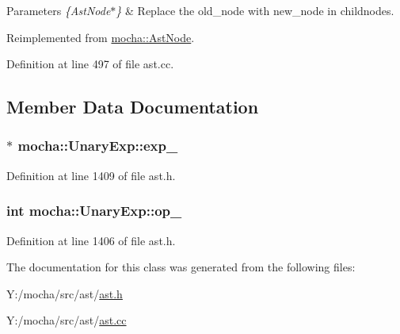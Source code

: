 \begin{DoxyParams}{Parameters}
{\em \{AstNode$\ast$\}} & Replace the old\_\-node with new\_\-node in childnodes. \\
\hline
\end{DoxyParams}


Reimplemented from \hyperlink{classmocha_1_1_ast_node_aa40396040f75fb59e320d81c3fd328c8}{mocha::AstNode}.



Definition at line 497 of file ast.cc.



\subsection{Member Data Documentation}
\hypertarget{classmocha_1_1_unary_exp_afbe580a73a5e48555f513b7096c74f9b}{
\subsubsection[{exp\_\-}]{$\ast$ {\bf mocha::UnaryExp::exp\_\-}}}
\label{classmocha_1_1_unary_exp_afbe580a73a5e48555f513b7096c74f9b}


Definition at line 1409 of file ast.h.

\hypertarget{classmocha_1_1_unary_exp_aefb5fdc7971ce049036dc626fd6d97f9}{
\subsubsection[{op\_\-}]{\setlength{\rightskip}{0pt plus 5cm}int {\bf mocha::UnaryExp::op\_\-}}}
\label{classmocha_1_1_unary_exp_aefb5fdc7971ce049036dc626fd6d97f9}


Definition at line 1406 of file ast.h.



The documentation for this class was generated from the following files:\begin{DoxyCompactItemize}
\item 
Y:/mocha/src/ast/\hyperlink{ast_8h}{ast.h}\item 
Y:/mocha/src/ast/\hyperlink{ast_8cc}{ast.cc}\end{DoxyCompactItemize}
